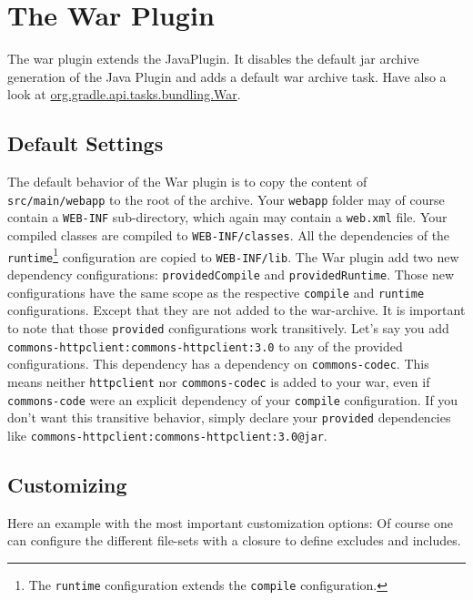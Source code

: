 \chapter{The War Plugin} %
\label{cha:the_war_plugin}
The war plugin extends the JavaPlugin. It disables the default jar archive generation of the Java Plugin and adds a default war archive task. Have also a look at \href{\API tasks/bundling/War.html}{org.gradle.api.tasks.bundling.War}.
\\
\section{Default Settings} %
\label{sec:default_settings}
The default behavior of the War plugin is to copy the content of \texttt{src/main/webapp} to the root of the archive. Your \texttt{webapp} folder may of course contain a \texttt{WEB-INF} sub-directory, which again may contain a \texttt{web.xml} file. Your compiled classes are compiled to \texttt{WEB-INF/classes}. All the dependencies of the \texttt{runtime}\footnote{The \texttt{runtime} configuration extends the \texttt{compile} configuration.} configuration are copied to \texttt{WEB-INF/lib}. The War plugin add two new dependency configurations: \texttt{providedCompile} and \texttt{providedRuntime}. Those new configurations have the same scope as the respective \texttt{compile} and \texttt{runtime} configurations. Except that they are not added to the war-archive. It is important to note that those \texttt{provided} configurations work transitively. Let's say you add \texttt{commons-httpclient:commons-httpclient:3.0} to any of the provided configurations. This dependency has a dependency on \texttt{commons-codec}. This means neither \texttt{httpclient} nor \texttt{commons-codec} is added to your war, even if \texttt{commons-code} were an explicit dependency of your \texttt{compile} configuration. If you don't want this transitive behavior, simply declare your \texttt{provided} dependencies like \texttt{commons-httpclient:commons-httpclient:3.0@jar}.
\section{Customizing} %
\label{sec:customizing}
Here an example with the most important customization options:
Of course one can configure the different file-sets with a closure to define excludes and includes.
\\

